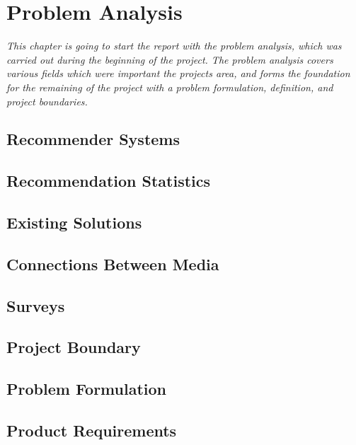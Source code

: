 \chapter{Problem Analysis}

\textit{This chapter is going to start the report with the problem analysis, which was carried out during the beginning of the project. The problem analysis covers various fields which were important the projects area, and forms the foundation for the remaining of the project with a problem formulation, definition, and project boundaries.}

\section{Recommender Systems}
\label{RecommenderSystems}

\section{Recommendation Statistics}
\label{Statistics}

\section{Existing Solutions}
\label{Existing}

\section{Connections Between Media}
\label{Connections}

\section{Surveys}
\label{Surveys}

\section{Project Boundary}
\label{Boundary}

\section{Problem Formulation}
\label{Formulation}

\section{Product Requirements}
\label{Requirements}
